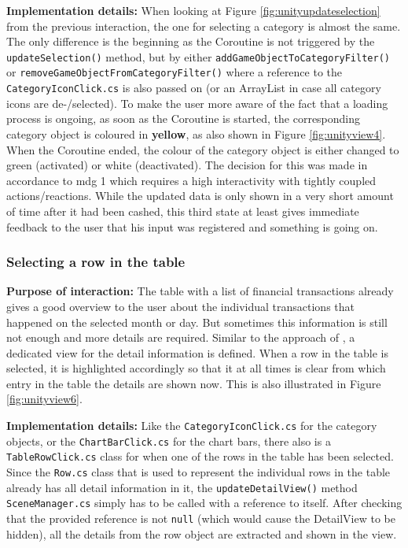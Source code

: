 \textbf{Implementation details:} When looking at Figure \ref{fig:unityupdateselection} from the previous interaction, the one for selecting a category is almost the same. The only difference is the beginning as the Coroutine is not triggered by the \texttt{updateSelection()} method, but by either \texttt{addGameObjectToCategoryFilter()} or \texttt{removeGameObjectFromCategoryFilter()} where a reference to the \texttt{CategoryIconClick.cs} is also passed on (or an ArrayList in case all category icons are de-/selected). To make the user more aware of the fact that a loading process is ongoing, as soon as the Coroutine is started, the corresponding category object is coloured in \textbf{yellow}, as also shown in Figure \ref{fig:unityview4}. When the Coroutine ended, the colour of the category object is either changed to green (activated) or white (deactivated). The decision for this was made in accordance to \gls{mdg} 1 which requires a high interactivity with tightly coupled actions/reactions. While the updated data is only shown in a very short amount of time after it had been cashed, this third state at least gives immediate feedback to the user that his input was registered and something is going on.


\subsubsection{Selecting a row in the table}

\textbf{Purpose of interaction:} The table with a list of financial transactions already gives a good overview to the user about the individual transactions that happened on the selected month or day. But sometimes this information is still not enough and more details are required. Similar to the approach of \cite{CodeScience2015}, a dedicated view for the detail information is defined. When a row in the table is selected, it is highlighted accordingly so that it at all times is clear from which entry in the table the details are shown now. This is also illustrated in Figure \ref{fig:unityview6}.

\textbf{Implementation details:} Like the \texttt{CategoryIconClick.cs} for the category objects, or the \texttt{ChartBarClick.cs} for the chart bars, there also is a \texttt{TableRowClick.cs} class for when one of the rows in the table has been selected. Since the \texttt{Row.cs} class that is used to represent the individual rows in the table already has all detail information in it, the \texttt{updateDetailView()} method \texttt{SceneManager.cs} simply has to be called with a reference to itself. After checking that the provided reference is not \texttt{null} (which would cause the DetailView to be hidden), all the details from the row object are extracted and shown in the view.


